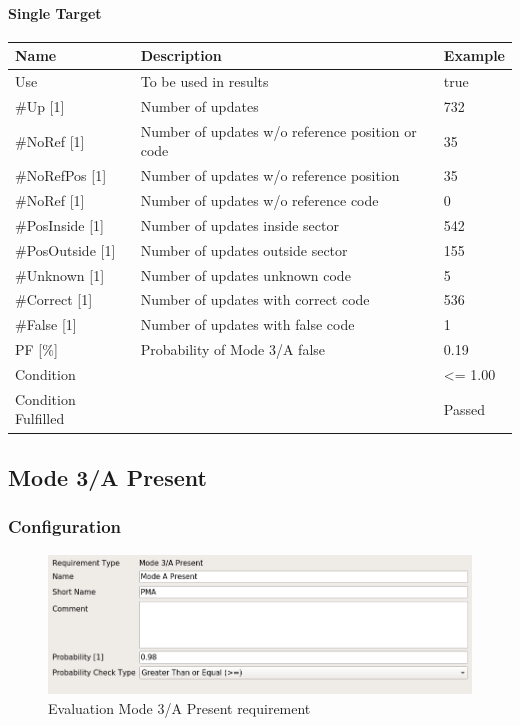 \paragraph{Single Target}

\begin{center}
 \begin{table}[H]
  \begin{tabularx}{\textwidth}{ | l | X |  l | }
    \hline
    \textbf{Name} & \textbf{Description} & \textbf{Example} \\ \hline
    Use & To be used in results & true \\ \hline
    \#Up [1] & Number of updates & 732 \\ \hline
    \#NoRef [1] & Number of updates w/o reference position or code & 35 \\ \hline
    \#NoRefPos [1] & Number of updates w/o reference position  & 35 \\ \hline
    \#NoRef [1] & Number of updates w/o reference code & 0 \\ \hline
    \#PosInside [1] & Number of updates inside sector & 542 \\ \hline
    \#PosOutside [1] & Number of updates outside sector & 155 \\ \hline
    \#Unknown [1] & Number of updates unknown code & 5 \\ \hline
    \#Correct [1] & Number of updates with correct code & 536 \\ \hline
    \#False [1] & Number of updates with false code & 1 \\ \hline
    PF [\%] & Probability of Mode 3/A false & 0.19 \\ \hline
    Condition &  & <= 1.00 \\ \hline
    Condition Fulfilled &  & Passed \\ \hline
\end{tabularx}
\end{table}
\end{center}

\subsection{Mode 3/A Present}
\label{sec:eval_req_m3a_present} 

\subsubsection{Configuration}

\begin{figure}[H]
    \includegraphics[width=14cm,frame]{../screenshots/eval_req_m3a_present.png}
  \caption{Evaluation Mode 3/A Present requirement}
\end{figure}

